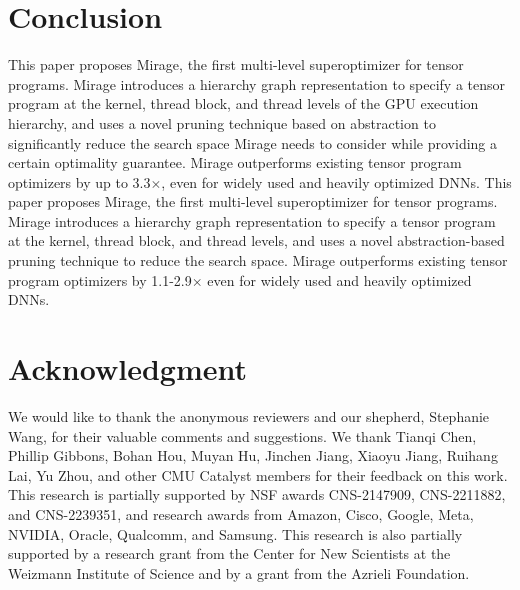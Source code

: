 \documentclass[letterpaper,twocolumn,10pt]{article}
\theoremstyle{definition}
\newcommand{\sys}{Mirage\xspace}
\newcommand{\sys}{MISO\xspace}
\begin{document}
\fi
\pagestyle{empty}




%

%

%






\section{Conclusion}
\label{sec:conclusion}
\iffinal
This paper proposes \sys, the first multi-level superoptimizer for tensor programs. \sys introduces a hierarchy graph representation to specify a tensor program at the kernel, thread block, and thread levels of the GPU execution hierarchy, and uses a novel pruning technique based on abstraction to significantly reduce the search space \sys needs to consider while providing a certain optimality guarantee. \sys outperforms existing tensor program optimizers by up to 3.3$\times$, even for widely used and heavily optimized DNNs.
\else
This paper proposes \sys, the first multi-level superoptimizer for tensor programs. \sys introduces a hierarchy graph representation to specify a tensor program at the kernel, thread block, and thread levels, and uses a novel abstraction-based pruning technique to reduce the search space. \sys outperforms existing tensor program optimizers by 1.1-2.9$\times$ even for widely used and heavily optimized DNNs.
\fi 

\iffinal
\section*{Acknowledgment}
We would like to thank the anonymous reviewers and our shepherd, Stephanie Wang, for their valuable comments and suggestions.
We thank Tianqi Chen, Phillip Gibbons, Bohan Hou, Muyan Hu, Jinchen Jiang, Xiaoyu Jiang, Ruihang Lai, Yu Zhou, and other CMU Catalyst members for their feedback on this work. This research is partially supported by NSF awards CNS-2147909, CNS-2211882, and CNS-2239351, and research awards from Amazon, Cisco, Google, Meta, NVIDIA, Oracle, Qualcomm, and Samsung.
%
This research is also partially supported by a research grant from the Center for New Scientists at the Weizmann Institute of Science and by a grant from the Azrieli Foundation.
\fi

\balance



%
\end{document}
